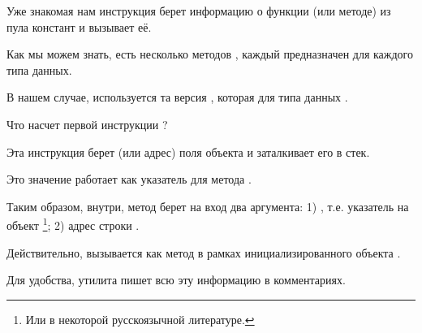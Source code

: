Уже знакомая нам инструкция  берет информацию о функции (или методе)  
из пула констант и вызывает её.

Как мы можем знать, есть несколько методов , каждый предназначен для каждого типа
данных.

В нашем случае, используется та версия , которая для типа данных .


Что насчет первой инструкции ?

Эта инструкция берет  (или адрес) поля объекта 
и заталкивает его в стек.

Это значение работает как указатель  для метода .

Таким образом, внутри, метод  берет на вход два аргумента:
1) , т.е. указатель на объект
\footnote{Или  в некоторой русскоязычной литературе.};
2) адрес строки .


Действительно,  вызывается как метод в рамках инициализированного объекта 
.


Для удобства, утилита  пишет всю эту информацию в комментариях.

